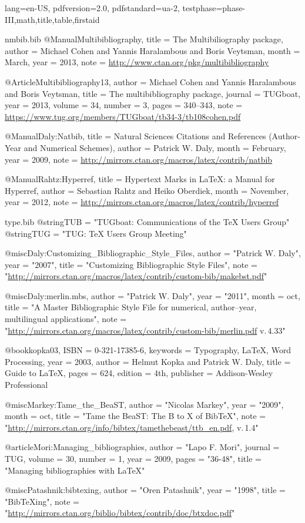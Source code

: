 \DocumentMetadata
  {
    lang=en-US,
    pdfversion=2.0,
    pdfstandard=ua-2,
    testphase={phase-III,math,title,table,firstaid}
  }
\begin{filecontents}[noheader]{nmbib.bib}
@Manual{Multibibliography,
  title = 	 {The {M}ultibiliography package},
  author =	 {Michael Cohen and Yannis Haralambous and Boris Veytsman},
  month =	 {March},
  year =	 2013,
  note =	 {\url{http://www.ctan.org/pkg/multibibliography}}
}

@Article{Multibibliography13,
  author = 	 {Michael Cohen and Yannis Haralambous and Boris Veytsman},
  title = 	 {The multibibliography package},
  journal = 	 {TUGboat},
  year = 	 2013,
  volume =	 34,
  number =	 3,
  pages =	 {340--343},
  note =	 {\url{https://www.tug.org/members/TUGboat/tb34-3/tb108cohen.pdf}}
}

@Manual{Daly:Natbib,
  title = 	 {Natural Sciences Citations and References
                  (Author-Year and Numerical Schemes)},
  author =	 {Patrick W. Daly},
  month =	 {February},
  year =	 2009,
  note =	 {\url{http://mirrors.ctan.org/macros/latex/contrib/natbib}}
}

@Manual{Rahtz:Hyperref,
  title = 	 {Hypertext Marks in \LaTeX: a Manual for Hyperref},
  author =	 {Sebastian Rahtz and Heiko Oberdiek},
  month =	 {November},
  year =	 2012,
  note =	 {\url{http://mirrors.ctan.org/macros/latex/contrib/hyperref}}
}
\end{filecontents}
\begin{filecontents}[noheader]{type.bib}
@string{TUB = "TUGboat: Communications of the {\TeX} Users Group"}
@string{TUG = "TUG: {\TeX} Users Group Meeting"}

@misc{Daly:Customizing_Bibliographic_Style_Files,
	author = "Patrick W. Daly",
	year = "2007",
	title = "Customizing Bibliographic Style Files",
	note = "\url{http://mirrors.ctan.org/macros/latex/contrib/custom-bib/makebst.pdf}"
}

@misc{Daly:merlin.mbs,
	author = "Patrick W. Daly",
	year = "2011",
	month = oct,
	title = "{A Master Bibliographic Style File for numerical, author--year, multilingual applications}",
	note = "\url{http://mirrors.ctan.org/macros/latex/contrib/custom-bib/merlin.pdf} v.\,4.33"
}

@book{kopka03,
	ISBN = {0-321-17385-6},
	keywords = {Typography, LaTeX, Word Processing},
	year = {2003},
	author = {Helmut Kopka and Patrick W. Daly},
	title = {Guide to LaTeX},
	pages = {624},
	edition = {4th},
	publisher = {Addison-Wesley Professional}
}

@misc{Markey:Tame_the_BeaST,
	author = "Nicolas Markey",
	year = "2009",
	month = oct,
	title = "{Tame the BeaST: The B to X of Bib{\TeX}}",
	note = "\url{http://mirrors.ctan.org/info/bibtex/tamethebeast/ttb_en.pdf}, v.\,1.4"
}

@article{Mori:Managing_bibliographies,
	author = "Lapo F. Mori",
	journal = TUG,
	volume = 30,
	number = 1,
	year = 2009,
	pages = "36-48",
	title = "Managing bibliographies with {\LaTeX}"
}

@misc{Patashnik:bibtexing,
	author = "Oren Patashnik",
	year = "1998",
	title = "Bib{\TeX}ing",
	note = "\url{http://mirrors.ctan.org/biblio/bibtex/contrib/doc/btxdoc.pdf}"
}
\end{filecontents}
